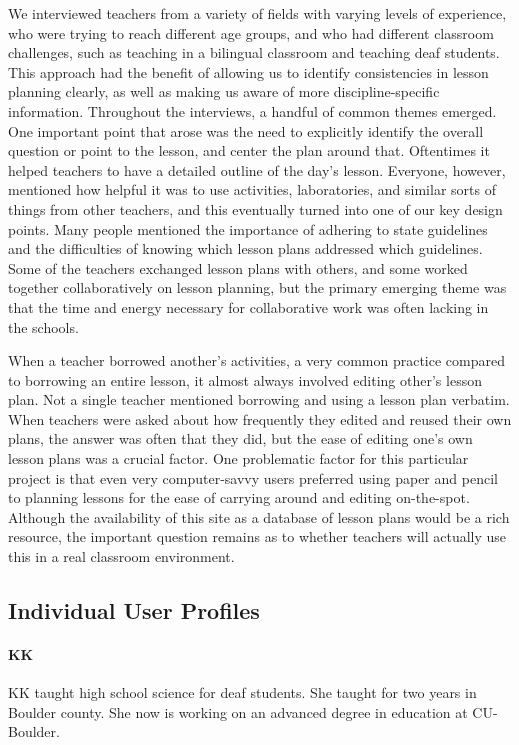 We interviewed teachers from a variety of fields with varying levels of
experience, who were trying to reach different age groups, and who had different
classroom challenges, such as teaching in a bilingual classroom and teaching
deaf students.  This approach had the benefit of allowing us to identify
consistencies in lesson planning clearly, as well as making us aware of more
discipline-specific information.  Throughout the interviews, a handful of common
themes emerged.  One important point that arose was the need to explicitly
identify the overall question or point to the lesson, and center the plan around
that.  Oftentimes it helped teachers to have a detailed outline of the day's
lesson.  Everyone, however, mentioned how helpful it was to use activities,
laboratories, and similar sorts of things from other teachers, and this
eventually turned into one of our key design points.  Many people mentioned the
importance of adhering to state guidelines and the difficulties of knowing which
lesson plans addressed which guidelines.  Some of the teachers exchanged lesson
plans with others, and some worked together collaboratively on lesson planning,
but the primary emerging theme was that the time and energy necessary for
collaborative work was often lacking in the schools.

When a teacher borrowed another's activities, a very common practice compared to
borrowing an entire lesson, it almost always involved editing other's lesson
plan.  Not a single teacher mentioned borrowing and using a lesson plan
verbatim.  When teachers were asked about how frequently they edited and reused
their own plans, the answer was often that they did, but the ease of editing
one's own lesson plans was a crucial factor.  One problematic factor for this
particular project is that even very computer-savvy users preferred using paper
and pencil to planning lessons for the ease of carrying around and editing
on-the-spot.  Although the availability of this site as a database of lesson
plans would be a rich resource, the important question remains as to whether
teachers will actually use this in a real classroom environment.

\subsection{Individual User Profiles}
\paragraph{KK} KK taught high school science for deaf students.  She taught for
two years in Boulder county.  She now is working on an advanced degree in
education at CU-Boulder.

